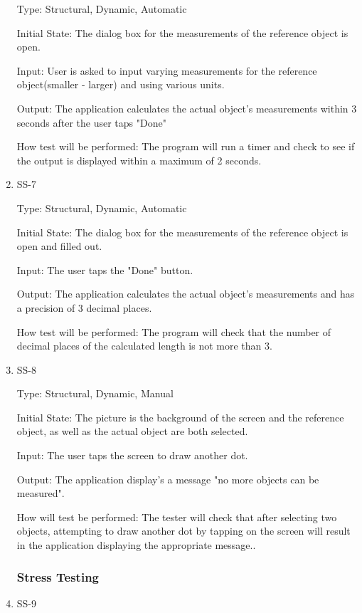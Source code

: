 \documentclass[12pt, titlepage]{article}
\begin{document}
\begin{enumerate}
Type: Structural, Dynamic, Automatic

Initial State: The dialog box for the measurements of the reference object is open.

Input: User is asked to input varying measurements for the reference object(smaller - larger) and using various units.

Output: The application calculates the actual object's measurements within 3 seconds after the user taps "Done"

How test will be performed: The program will run a timer and check to see if the output is displayed within a maximum of 2 seconds.

\item{SS-7\\}

Type: Structural, Dynamic, Automatic

Initial State: The dialog box for the measurements of the reference object is open and filled out.

Input: The user taps the "Done" button.

Output: The application calculates the actual object's measurements and has a precision of 3 decimal places.

How test will be performed: The program will check that the number of decimal places of the calculated length is not more than 3.

\item{SS-8\\}

Type: Structural, Dynamic, Manual

Initial State: The picture is the background of the screen and the reference object, as well as the actual object are both selected.

Input: The user taps the screen to draw another dot.

Output: The application display's a message "no more objects can be measured".

How will test be performed: The tester will check that after selecting two objects, attempting to draw another dot by tapping on the screen will result in the application displaying the appropriate message.. 

\subsubsection{Stress Testing}
\item{SS-9\\}


\end{enumerate}
\end{document}
